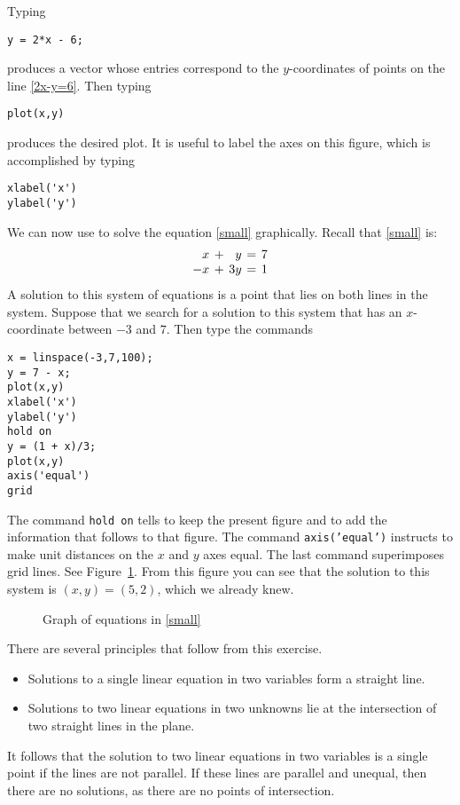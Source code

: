 \documentclass{ximera}
\begin{document}
Typing
\begin{verbatim}
y = 2*x - 6;
\end{verbatim}
produces a vector whose entries correspond to the
$y$-coordinates of points on the line \eqref{2x-y=6}.  Then typing
\begin{verbatim}
plot(x,y)
\end{verbatim}
produces the desired plot.  It is useful to label the axes on
this figure, which is accomplished by typing
\begin{verbatim}
xlabel('x')
ylabel('y')
\end{verbatim} 

We can now use \Matlab to solve the equation \eqref{small}
graphically.  Recall that \eqref{small} is:
\[
\arraycolsep 2pt
\begin{array}{rcrcr}
 x & + &  y & = & 7 \\
-x & + & 3y & = & 1
\end{array}
\]
A solution to this system of equations is a point that lies on
both lines in the system.  Suppose that we search for a solution
to this system that has an $x$-coordinate between $-3$ and $7$.
Then type the commands
\begin{verbatim}
x = linspace(-3,7,100);
y = 7 - x;
plot(x,y)
xlabel('x')
ylabel('y')
hold on
y = (1 + x)/3;
plot(x,y)
axis('equal')
grid
\end{verbatim}  
The \Matlab command {\tt hold on} tells \Matlab to keep the
present figure and to add the information that follows to that figure.
The command {\tt axis('equal')} instructs \Matlab to make unit distances
on the $x$ and $y$ axes equal.  The last \Matlab command superimposes
grid lines. See Figure~\ref{lineint}.  From this figure
you can see that the solution to this system is $(x,y)=(5,2)$, which
we already knew.

\begin{figure}[htb]
                       \centerline{%
                       }
                       \caption{Graph of equations in \protect\eqref{small}}
                       \label{lineint}
\end{figure}


There are several principles that follow from this exercise.
\begin{itemize}
\item   Solutions to a single linear equation in two variables
form a straight line.
\item Solutions to two linear equations in two unknowns lie at
the intersection of two straight lines in the plane.
\end{itemize}
It follows that the solution to two linear equations in two
variables is a single point if the lines are not parallel.  If
these lines are parallel and unequal, then there are no
solutions, as there are no points of intersection.
\end{document}
